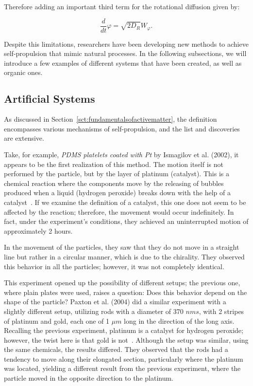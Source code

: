 Therefore adding an important third term for the rotational diffusion given by:

\begin{equation}
  \frac{d}{dt}{\varphi} = \sqrt{2D_R}W _{\varphi}.
  \label{eq:rotationaldiffusion}
\end{equation}


Despite this limitations, researchers have been developing new methods to achieve self-propulsion that mimic natural processes. In the following subsections, we will introduce a few examples of different systems that have been created, as well as organic ones.


\subsection{Artificial Systems}

As discussed in Section~\ref{sct:fundamentalsofactivematter}, the definition encompasses various mechanisms of self-propulsion, and the list and discoveries are extensive.

Take, for example, \textit{PDMS platelets coated with Pt} by Ismagilov et al. (2002), it appears to be the first realization of this method. The motion itself is not performed by the particle, but by the layer of platinum (catalyst). This is a chemical reaction where the components move by the releasing of bubbles produced when a liquid (hydrogen peroxide) breaks down with the help of a catalyst~\cite{ismagilov2002autonomous}. If we examine the definition of a catalyst, this one does not seem to be affected by the reaction; therefore, the movement would occur indefinitely. In fact, under the experiment's conditions, they achieved an uninterrupted motion of approximately 2 hours. 

In the movement of the particles, they saw that they do not move in a straight line but rather in a circular manner, which is due to the chirality. They observed this behavior in all the particles; however, it was not completely identical.  


This experiment opened up the possibility of different setups; the previous one, where plain plates were used, raises a question: Does this behavior depend on the shape of the particle? Paxton et al. (2004) did a similar experiment with a slightly different setup, utilizing rods with a diameter of  370 $nms$, with 2 stripes of platinum and gold, each one of 1 $\mu m$ long in the direction of the long axis. Recalling the previous experiment, platinum is a catalyst for hydrogen peroxide; however, the twist here is that gold is not~\cite{paxton2004catalytic}. Although the setup was similar, using the same chemicals, the results differed. They observed that the rods had a tendency to move along their elongated section, particularly where the platinum was located, yielding a different result from the previous experiment, where the particle moved in the opposite direction to the platinum.


